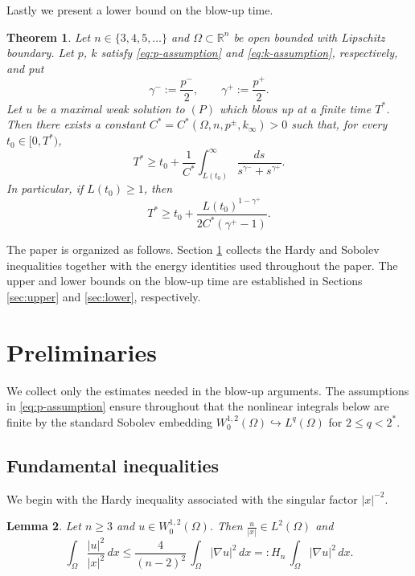 \documentclass[12pt,reqno]{amsart}
\newtheorem{theorem}{Theorem}[section]
\newtheorem{lemma}[theorem]{Lemma}
\theoremstyle{definition}
\theoremstyle{remark}
\numberwithin{equation}{section}
\newcommand{\R}{\mathbb{R}}
\begin{document}
Lastly we present a lower bound on the blow-up time.


\begin{theorem} \label{thm:lower}
	Let $n \in \{3,4,5,\ldots\}$ and $\Omega \subset \R^n$ be open bounded with Lipschitz boundary.
	Let $p$, $k$ satisfy \eqref{eq:p-assumption} and \eqref{eq:k-assumption}, respectively, and put
	\[
	\gamma^-:=\frac{p^-}{2},
	\qquad
	\gamma^+:=\frac{p^+}{2}.
	\]
	Let $u$ be a maximal weak solution to $(P)$ which blows up at a finite time $T^*$.
	Then there exists a constant
	$C^*=C^*(\Omega,n,p^\pm,k_\infty)>0$ such that, for every $t_0\in[0,T^*)$,
	\[
	T^* \ge t_0+\frac{1}{C^*}
	\int_{L(t_0)}^\infty
	\frac{ds}{s^{\gamma^-}+s^{\gamma^+}}.
	\]
	In particular, if $L(t_0)\ge1$, then
	\[
	T^*\ge t_0+
	\frac{L(t_0)^{1-\gamma^+}}
	{2C^*(\gamma^+-1)}.
	\]
\end{theorem}


The paper is organized as follows.
Section \ref{sec:prelim} collects the Hardy and Sobolev inequalities together with the energy identities used throughout the paper.
The upper and lower bounds on the blow-up time are established in Sections \ref{sec:upper} and \ref{sec:lower}, respectively.




\section{Preliminaries} \label{sec:prelim}

We collect only the estimates needed in the blow-up arguments. The assumptions in \eqref{eq:p-assumption} ensure throughout that the nonlinear integrals below are finite by the standard Sobolev embedding $W^{1,2}_0(\Omega)\hookrightarrow L^q(\Omega)$ for $2\le q<2^*$.


\subsection{Fundamental inequalities}

We begin with the Hardy inequality associated with the singular factor $|x|^{-2}$.


\begin{lemma}
	Let $n \ge 3$ and $u \in W^{1,2}_0(\Omega)$.
	Then $\displaystyle\frac{u}{|x|} \in L^2(\Omega)$ and
	\[
	\int_{\Omega} \frac{|u|^2}{|x|^2} \, dx 
	\le \frac{4}{(n-2)^2} \, \int_{\Omega} |\nabla u|^2 \, dx
	=: H_n \, \int_{\Omega} |\nabla u|^2 \, dx.
	\]
\end{lemma}
\end{document}

